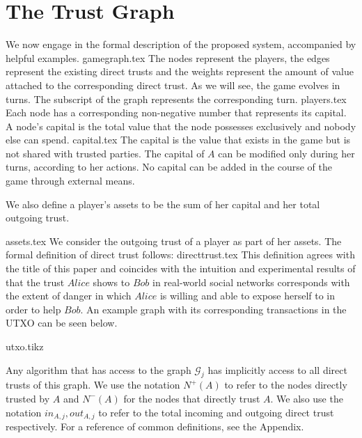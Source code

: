 \section{The Trust Graph}
  We now engage in the formal description of the proposed system, accompanied by helpful examples.
  {gamegraph.tex}
  The nodes represent the players, the edges represent the existing direct trusts and the weights represent the amount of
  value attached to the corresponding direct trust. As we will see, the game evolves in turns. The subscript of the graph
  represents the corresponding turn.
  {players.tex}
  Each node has a corresponding non-negative number that represents its capital. A node's capital is the total value that
  the node possesses exclusively and nobody else can spend.
  {capital.tex}
  The capital is the value that exists in the game but is not shared with trusted parties. The capital of $A$ can be
  modified only during her turns, according to her actions. No capital can be added in the course of the game through
  external means.

  We also define a player's assets to be the sum of her capital and her total outgoing trust.

  {assets.tex}
  We consider the outgoing trust of a player as part of her assets. The formal definition of direct trust follows:
  {directtrust.tex}
  This definition agrees with the title of this paper and coincides with the intuition and experimental results of
  \cite{kmrs} that the trust $Alice$ shows to $Bob$ in real-world social networks corresponds with the extent
  of danger in which $Alice$ is willing and able to expose herself to in order to help $Bob$. An example graph with its
  corresponding transactions in the UTXO can be seen below.

  {utxo.tikz}

  Any algorithm that has access to the graph $\mathcal{G}_j$ has implicitly access to all direct trusts of this graph.
  We use the notation $N^{+}(A)$ to refer to the nodes directly trusted by $A$ and $N^{-}(A)$ for the nodes that directly
  trust $A$. We also use the notation $in_{A, j}, out_{A, j}$ to refer to the total incoming and outgoing direct trust
  respectively. For a reference of common definitions, see the Appendix.
